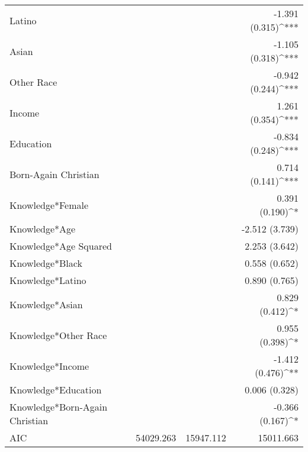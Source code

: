\begin{tabular}{l D{)}{)}{13)3} D{)}{)}{13)3} D{)}{)}{13)3} }
Latino                             &                        &                         & -1.391 \; (0.315)^{***} \\
Asian                              &                        &                         & -1.105 \; (0.318)^{***} \\
Other Race                         &                        &                         & -0.942 \; (0.244)^{***} \\
Income                             &                        &                         & 1.261 \; (0.354)^{***}  \\
Education                          &                        &                         & -0.834 \; (0.248)^{***} \\
Born-Again Christian               &                        &                         & 0.714 \; (0.141)^{***}  \\
Knowledge*Female                   &                        &                         & 0.391 \; (0.190)^{*}    \\
Knowledge*Age                      &                        &                         & -2.512 \; (3.739)       \\
Knowledge*Age Squared              &                        &                         & 2.253 \; (3.642)        \\
Knowledge*Black                    &                        &                         & 0.558 \; (0.652)        \\
Knowledge*Latino                   &                        &                         & 0.890 \; (0.765)        \\
Knowledge*Asian                    &                        &                         & 0.829 \; (0.412)^{*}    \\
Knowledge*Other Race               &                        &                         & 0.955 \; (0.398)^{*}    \\
Knowledge*Income                   &                        &                         & -1.412 \; (0.476)^{**}  \\
Knowledge*Education                &                        &                         & 0.006 \; (0.328)        \\
Knowledge*Born-Again Christian     &                        &                         & -0.366 \; (0.167)^{*}   \\
\midrule
AIC                                & 54029.263              & 15947.112               & 15011.663               \\

\end{tabular}
